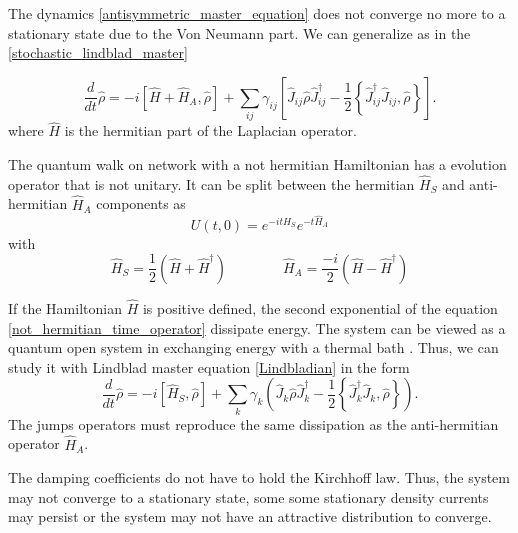 The dynamics \eqref{antisymmetric_master_equation} does not converge no more to a stationary state due to the Von Neumann part.
We can generalize as in the \eqref{stochastic_lindblad_master} 

\begin{equation}
    \frac{d}{dt}\hat \rho = -i\left[\hat H + \hat H_{A},\hat\rho\right] + \sum_{ij}\gamma_{ij}\left[\hat J_{ij} \hat\rho\hat J_{ij}^\dagger -\frac{1}{2} \left\{ \hat J_{ij}^\dagger \hat J_{ij}, \hat\rho\right\}\right].
\end{equation}
where $\hat H$ is the hermitian part of the Laplacian operator.


\bigskip

The quantum walk on network with a not hermitian Hamiltonian has a evolution operator that is not unitary. It can be split between the hermitian $\hat H_S$ and anti-hermitian $\hat H_A$ components as
\begin{equation}\label{not_hermitian_time_operator}
    U(t,0) = e^{-it\hat H_S} e^{-t\hat H_A}
\end{equation}
with
\begin{equation}
    \hat H_S =  \frac{1}{2}\left(\hat H + \hat H^\dagger\right) \qquad \qquad
    \hat H_A = \frac{-i}{2}\left(\hat H - \hat H^\dagger\right)
\end{equation}

If the Hamiltonian $\hat H$ is positive defined, the second exponential of the equation \eqref{not_hermitian_time_operator} dissipate energy. 
The system can be viewed as a quantum open system in exchanging energy with a thermal bath \cite{Korsch_2019}. Thus, we can study it with Lindblad master equation \eqref{Lindbladian} in the form
\begin{equation}
    \frac{d}{dt}\hat\rho = -i\left[\hat H_S,\hat\rho\right] + \sum_k \gamma_k \left(\hat J_k \hat\rho \hat J^\dagger_k - \frac{1}{2}\left\{ \hat J^\dagger_k\hat J_k, \hat\rho\right\} \right).
\end{equation}
The jumps operators must reproduce the same dissipation as the anti-hermitian operator $\hat H_A$.

The damping coefficients do not have to hold the Kirchhoff law. Thus, the system may not converge to a stationary state, some some stationary density currents may persist or the system may not have an attractive distribution to converge.